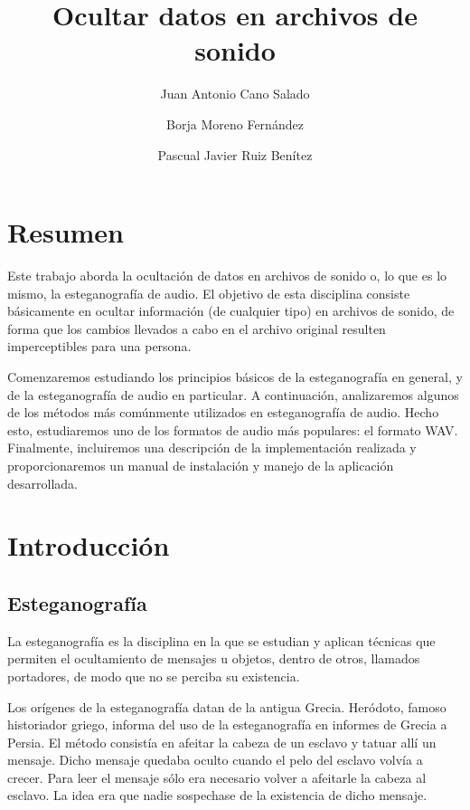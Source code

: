 \documentclass[12pt]{article}
\title{Ocultar datos en archivos de sonido}
\author{Juan Antonio Cano Salado \and Borja Moreno Fernández \and Pascual Javier Ruiz Benítez}
\begin{document}
\maketitle

\newpage
\tableofcontents

\newpage
\section{Resumen}

Este trabajo aborda la ocultación de datos en archivos de sonido o, lo que es lo mismo, la esteganografía de audio. El objetivo de esta disciplina consiste básicamente en ocultar información (de cualquier tipo) en archivos de sonido, de forma que los cambios llevados a cabo en el archivo original resulten imperceptibles para una persona.

Comenzaremos estudiando los principios básicos de la esteganografía en general, y de la esteganografía de audio en particular. A continuación, analizaremos algunos de los métodos más comúnmente utilizados en esteganografía de audio. Hecho esto, estudiaremos uno de los formatos de audio más populares: el formato WAV. Finalmente, incluiremos una descripción de la implementación realizada y proporcionaremos un manual de instalación y manejo de la aplicación desarrollada.

\newpage
\section{Introducción}

\subsection{Esteganografía}

La esteganografía es la disciplina en la que se estudian y aplican técnicas que permiten el ocultamiento de mensajes u objetos, dentro de otros, llamados portadores, de modo que no se perciba su existencia.

Los orígenes de la esteganografía datan de la antigua Grecia. Heródoto, famoso historiador griego, informa del uso de la esteganografía en informes de Grecia a Persia. El método consistía en afeitar la cabeza de un esclavo y tatuar allí un mensaje. Dicho mensaje quedaba oculto cuando el pelo del esclavo volvía a crecer. Para leer el mensaje sólo era necesario volver a afeitarle la cabeza al esclavo. La idea era que nadie sospechase de la existencia de dicho mensaje.
\end{document}
